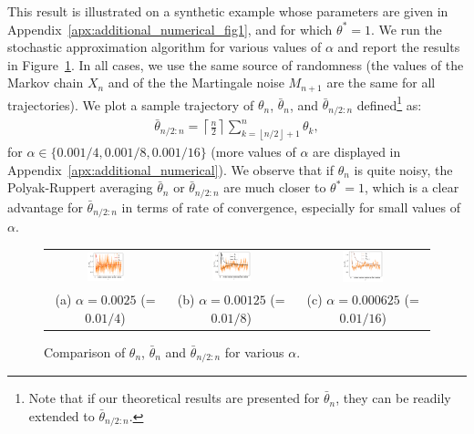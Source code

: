 \documentclass{article}
\newcommand\floor[1]{\left\lfloor#1\right\rfloor}
\begin{document}
This result is illustrated on a synthetic example whose parameters are given in Appendix~\ref{apx:additional_numerical_fig1}, and for which $\theta^*=1$. We run the stochastic approximation algorithm for various values of $\alpha$ and report the results in Figure~\ref{fig:illustration_bias_X_bar_1}.  In all cases, we use the same source of randomness (the values of the Markov chain $X_n$ and of the the Martingale noise $M_{n+1}$ are the same for all trajectories). We plot a sample trajectory of $\theta_n$, $\bar{\theta}_n$, and $\bar{\theta}_{n/2:n}$ defined\footnote{Note that if our theoretical results are presented for $\bar{\theta}_n$, they can be readily extended to $\bar{\theta}_{n/2:n}$.} as: 
\begin{align*}
    \bar{\theta}_{n/2:n}=\left\lceil \frac n2 \right\rceil \sum_{k=\floor{n/2}+1}^n\theta_k,
\end{align*}
for $\alpha\in\{0.001/4, 0.001/8, 0.001/16\}$ (more values of $\alpha$ are displayed in Appendix~\ref{apx:additional_numerical}). We observe that if $\theta_n$ is quite noisy, the Polyak-Ruppert averaging $\bar{\theta}_n$ or $\bar{\theta}_{n/2:n}$ are much closer to $\theta^*=1$, which is a clear advantage for $\bar{\theta}_{n/2:n}$ in terms of rate of convergence, especially for small values of $\alpha$.

\begin{figure}[ht]
    \centering
    \begin{tabular}{@{}c@{}c@{}c@{}}
        \includegraphics[width=0.33\textwidth]{traj_SA_thetaBar_0.pdf}
        &\includegraphics[width=0.33\textwidth]{traj_SA_thetaBar_1.pdf}
        &\includegraphics[width=0.33\textwidth]{traj_SA_thetaBar_2.pdf}\\
        (a) $\alpha=0.0025$ (=$0.01/4$)
        &(b) $\alpha=0.00125$ (=$0.01/8$)
        &(c) $\alpha=0.000625$ (=$0.01/16$)
    \end{tabular}
    \caption{Comparison of $\theta_n$, $\bar{\theta}_n$ and $\bar{\theta}_{n/2:n}$ for various $\alpha$.}
    \label{fig:illustration_bias_X_bar_1}
\end{figure}
\end{document}
